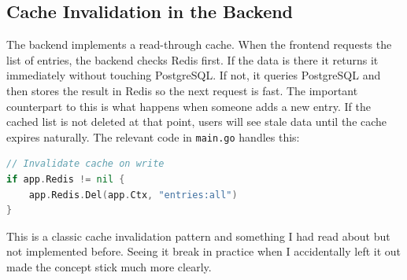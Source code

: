 \subsection{Cache Invalidation in the Backend}

The backend implements a read-through cache. When the frontend requests the list of
entries, the backend checks Redis first. If the data is there it returns it immediately
without touching PostgreSQL. If not, it queries PostgreSQL and then stores the result
in Redis so the next request is fast. The important counterpart to this is what happens
when someone adds a new entry. If the cached list is not deleted at that point, users
will see stale data until the cache expires naturally. The relevant code in
\texttt{main.go} handles this:

\begin{lstlisting}[language=Go]
// Invalidate cache on write
if app.Redis != nil {
    app.Redis.Del(app.Ctx, "entries:all")
}
\end{lstlisting}

This is a classic cache invalidation pattern and something I had read about but not
implemented before. Seeing it break in practice when I accidentally left it out made the
concept stick much more clearly.
